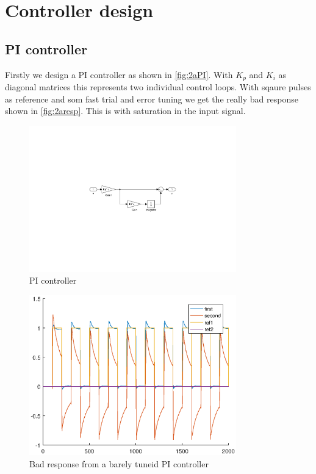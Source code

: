 \documentclass[a4paper]{scrartcl}
\begin{document}
\section{Controller design}
\subsection{PI controller}
Firstly we design a PI controller as shown in \autoref{fig:2aPI}. With $K_p$ and $K_i$ as diagonal matrices this represents two individual control loops. With sqaure pulses as reference and som fast trial and error tuning we get the really bad response shown in \autoref{fig:2aresp}. This is with saturation in the input signal.
\begin{figure}[ht!]
	\centering
	\includegraphics[width=0.8\textwidth]{fig/PI.pdf}
	\caption{PI controller}
	\label{fig:2aPI}
\end{figure}
\begin{figure}[ht!]
	\centering
	\includegraphics[width=0.8\textwidth]{fig/PI_bad.eps}
	\caption{Bad response from a barely tuneid PI controller}
	\label{fig:2aresp}
\end{figure}
\end{document}
